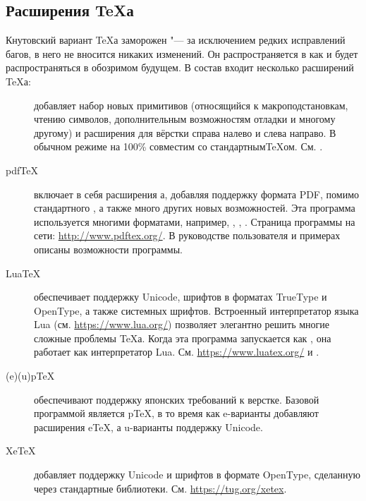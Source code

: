 \documentclass{article}
\begin{document}
\subsection{Расширения \protect\TeX{}а}
\label{sec:tex-extensions}

Кнутовский вариант \TeX а заморожен "--- за исключением редких
исправлений багов, в него не вносится никаких изменений.  Он 
распространяется в \TL{} как  и будет распространяться в
обозримом будущем. В состав \TL{} входит несколько расширений \TeX{}а:

\begin{description}

\item [\eTeX] добавляет набор новых примитивов
\label{text:etex}
(относящийся к макроподстановкам, чтению символов, дополнительным
возможностям отладки и многому другому) и расширения \TeXXeT{} для
вёрстки справа налево и слева направо.  В обычном режиме \eTeX{} на
100\% совместим со стандартным\TeX{}ом. См.
.  

\item [pdf\TeX] включает в себя расширения \eTeX а, добавляя поддержку
  формата PDF, помимо стандартного \dvi{}, а также много других
  новых возможностей.  Эта программа используется многими
  форматами, например, , , .
  Страница программы на сети: \url{http://www.pdftex.org/}.  В
  руководстве пользователя
   и примерах
   описаны
  возможности программы.

\item[Lua\TeX] обеспечивает поддержку Unicode, шрифтов в форматах
  TrueType и OpenType, а также системных шрифтов.  Встроенный
  интерпретатор языка Lua (см.  \url{https://www.lua.org/}) позволяет
  элегантно решить многие сложные проблемы \TeX а.  Когда эта
  программа запускается как , она работает как
  интерпретатор Lua.  См.  \url{https://www.luatex.org/} и
  .

\item[(e)(u)p\TeX] обеспечивают поддержку японских требований к
  верстке.  Базовой программой является p\TeX, в то время как
  e-варианты добавляют расширения e\TeX, а u-варианты поддержку
  Unicode.  

\item [Xe\TeX] добавляет поддержку Unicode и шрифтов в формате
  OpenType, сделанную через стандартные библиотеки.  См.
  \url{https://tug.org/xetex}.


\end{description}
\end{document}
